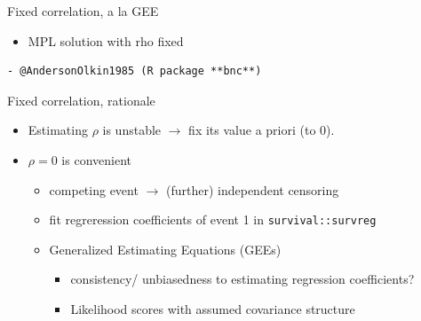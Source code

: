 \begin{frame}[fragile]{Fixed correlation, a la GEE}
\protect\hypertarget{fixed-correlation-a-la-gee}{}

\begin{itemize}
\tightlist
\item
  MPL solution with rho fixed
\end{itemize}

\begin{verbatim}
- @AndersonOlkin1985 (R package **bnc**)
\end{verbatim}

\begin{block}{Fixed correlation, rationale}

\begin{itemize}
\tightlist
\item
  Estimating \(\rho\) is unstable \(\to\) fix its value a priori (to 0).
\item
  \(\rho=0\) is convenient

  \begin{itemize}
  \tightlist
  \item
    competing event \(\to\) (further) independent censoring
  \item
    fit regreression coefficients of event 1 in
    \texttt{survival::survreg}
  \item
    Generalized Estimating Equations (GEEs)

    \begin{itemize}
    \tightlist
    \item
      consistency/ unbiasedness to estimating regression coefficients?
    \item
      Likelihood scores with assumed covariance structure
    \end{itemize}
  \end{itemize}
\end{itemize}
\end{block}

\end{frame}

